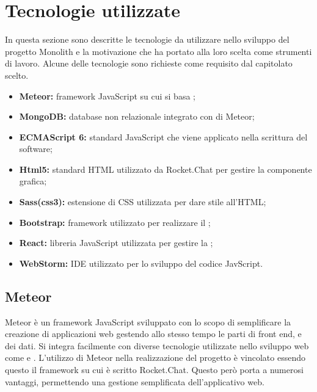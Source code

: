 \section{Tecnologie utilizzate}
In questa sezione sono descritte le tecnologie da utilizzare nello sviluppo del progetto Monolith e la motivazione che ha portato alla loro scelta come strumenti di lavoro. Alcune delle tecnologie sono richieste come requisito dal capitolato scelto.
\begin{itemize}
	\item \textbf{Meteor:} framework JavaScript su cui si basa ;
	\item \textbf{MongoDB:} database non relazionale integrato con di Meteor;
	\item \textbf{ECMAScript 6:} standard JavaScript che viene applicato nella scrittura del software;
	\item \textbf{Html5:} standard HTML utilizzato da Rocket.Chat per gestire la componente grafica;
	\item \textbf{Sass(css3):} estensione di CSS utilizzata per dare stile all'HTML; 
	\item \textbf{Bootstrap:} framework utilizzato per realizzare il ;
	\item \textbf{React:} libreria JavaScript utilizzata per gestire la ;
	\item \textbf{WebStorm:} IDE utilizzato per lo sviluppo del codice JavScript.
\end{itemize}

\subsection{Meteor}
Meteor è un framework JavaScript sviluppato con lo scopo di semplificare la creazione di applicazioni web gestendo allo stesso tempo le parti di front end,  e dei dati. Si integra facilmente con diverse tecnologie utilizzate nello sviluppo web come  e .
L’utilizzo di Meteor nella realizzazione del progetto è vincolato essendo questo il framework su cui è scritto Rocket.Chat. Questo però porta a numerosi vantaggi, permettendo una gestione semplificata dell'applicativo web.

